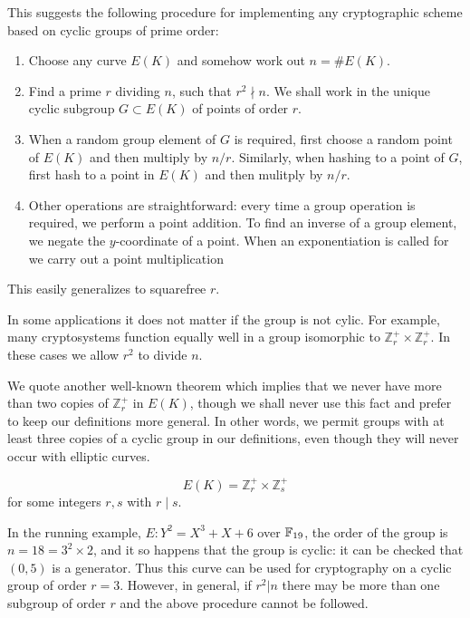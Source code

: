 This suggests the following procedure for implementing any cryptographic
scheme based on cyclic groups of prime order:

\begin{enumerate}
\item
Choose any curve $E(K)$ and somehow work out $n = \#E(K)$.
\item
Find a prime $r$ dividing $n$, such that $r^2 \nmid n$.
We shall work in the unique cyclic subgroup $G \subset E(K)$ of points
of order $r$.
\item
When a random group element of $G$ is required, first choose a random point
of $E(K)$ and then multiply by $n / r$. Similarly, when hashing to
a point of $G$, first hash to a point in $E(K)$ and then mulitply by
$n / r$.
\item
Other operations are straightforward: every time a group
operation is required, we perform a point addition. To find an inverse
of a group element, we negate the $y$-coordinate of a point. When
an exponentiation is called for we carry out a point multiplication
\end{enumerate}

This easily generalizes to squarefree $r$.

In some applications it does not matter if the group is not
cylic. For example, many cryptosystems function equally well
in a group isomorphic to $\mathbb{Z}_{r}^+ \times \mathbb{Z}_{r}^+$.
In these cases we allow $r^2$ to divide $n$.

We quote another well-known theorem which implies that we
never have more than two copies of $\mathbb{Z}_r^+$ in
$E(K)$, though we shall never use this fact and prefer to
keep our definitions more general. In other words, we permit groups
with at least three copies of a cyclic group in our definitions,
even though they will never occur with elliptic curves.

\begin{theorem}
\[ E(K) = \mathbb{Z}_r^+ \times \mathbb{Z}_s^+ \]
for some integers $r,s$ with $r \mid s$.
\end{theorem}

In the running example, $E : Y^2 = X^3 + X + 6$ over $\mathbb{F}_{19}$,
the order of the group is $n = 18 = 3^2 \times 2$, and it so happens
that the group is cyclic: it can be checked that $(0,5)$ is a generator.
Thus this curve can be used
for cryptography on a cyclic group of order $r = 3$. However, in general,
if $r^2 | n$ there may be more than one subgroup of order $r$ and the
above procedure cannot be followed.


